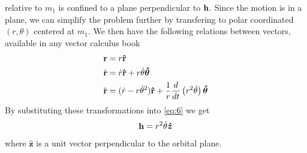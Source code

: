 \documentclass[ twoside,openright,titlepage,numbers=noenddot,headinclude,%
                footinclude=true,cleardoublepage=empty,abstractoff, %
                BCOR=5mm,paper=a4,fontsize=11pt,%
                american,%
                ]{scrreprt}
\begin{document}
relative to $m_1$ is confined to a plane perpendicular to $\boldsymbol{\mathbf{h}}$. Since 
the motion is in a plane, we can simplify the problem further by transfering
to polar coordinated $(r,\theta)$ centered at $m_1$. We then have the following
relations between vectors, available in any vector calculus book
\begin{align}
\boldsymbol{\mathbf{r}} &=r\boldsymbol{\mathbf{\hat{r}}}\\
    \dot{\boldsymbol{\mathbf{r}}} &= \dot{r}\boldsymbol{\mathbf{\hat{r}}} + r\dot{\theta}\boldsymbol{\hat\theta}\\
    \ddot{\boldsymbol{\mathbf{r}}} &= (\dot{r} - r\dot{\theta}^2)\boldsymbol{\mathbf{\hat{r}}} + \frac{1}{r} 
    \frac{d}{dt}\left(r^2\dot{\theta}\right)\boldsymbol{\hat\theta}\label{eq:9}
\end{align}
By substituting these transformations into \cref{eq:6} we get
\begin{equation}
\boldsymbol{\mathbf{h}}=r^2\dot{\theta}\boldsymbol{\hat z}
    \label{eq:10}
\end{equation}
where $\boldsymbol{\hat z}$ is a unit vector perpendicular to the orbital plane. 
\end{document}
